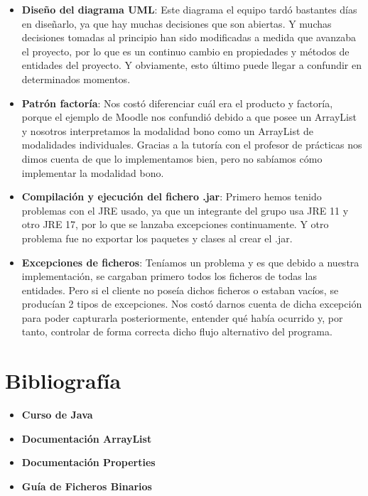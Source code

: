 \documentclass{article}
\begin{document}
	\begin{itemize}
		\item \textbf{Diseño del diagrama UML}: Este diagrama el equipo tardó bastantes días en diseñarlo, ya que hay muchas decisiones que son abiertas. Y muchas decisiones tomadas al principio han sido modificadas a medida que avanzaba el proyecto, por lo que es un continuo cambio en propiedades y métodos de entidades del proyecto. Y obviamente, esto último puede llegar a confundir en determinados momentos.
		\item \textbf{Patrón factoría}: Nos costó diferenciar cuál era el producto y factoría, porque el ejemplo de Moodle nos confundió debido a que posee un ArrayList y nosotros interpretamos la modalidad bono como un ArrayList de modalidades individuales. Gracias a la tutoría con el profesor de prácticas nos dimos cuenta de que lo implementamos bien, pero no sabíamos cómo implementar la modalidad bono.
		\item \textbf{Compilación y ejecución del fichero .jar}: Primero hemos tenido problemas con el JRE usado, ya que un integrante del grupo usa JRE 11 y otro JRE 17, por lo que se lanzaba excepciones continuamente. Y otro problema fue no exportar los paquetes y clases al crear el .jar.
		\item \textbf{Excepciones de ficheros}: Teníamos un problema y es que debido a nuestra implementación, se cargaban primero todos los ficheros de todas las entidades. Pero si el cliente no poseía dichos ficheros o estaban vacíos, se producían 2 tipos de excepciones. Nos costó darnos cuenta de dicha excepción para poder capturarla posteriormente, entender qué había ocurrido y, por tanto, controlar de forma correcta dicho flujo alternativo del programa.
	\end{itemize}
	
	\section{Bibliografía}
	\begin{itemize}
		\item \textbf{Curso de Java}
		\item \textbf{Documentación ArrayList}
		\item \textbf{Documentación Properties}
		\item \textbf{Guía de Ficheros Binarios}
	\end{itemize}
	
\end{document}
